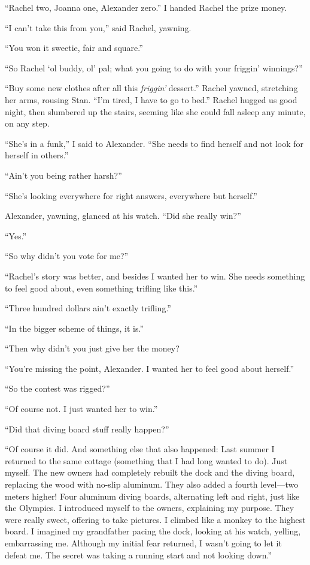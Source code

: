 ``Rachel two, Joanna one, Alexander zero.'' I handed Rachel the prize
money.

``I can't take this from you,'' said Rachel, yawning.

``You won it sweetie, fair and square.''

``So Rachel `ol buddy, ol' pal; what you going to do with your friggin'
winnings?''

``Buy some new clothes after all this \emph{friggin'} dessert.'' Rachel
yawned, stretching her arms, rousing Stan. ``I'm tired, I have to go to
bed.'' Rachel hugged us good night, then slumbered up the stairs,
seeming like she could fall asleep any minute, on any step.

``She's in a funk,'' I said to Alexander. ``She needs to find herself
and not look for herself in others.''

``Ain't you being rather harsh?''

``She's looking everywhere for right answers, everywhere but herself.''

Alexander, yawning, glanced at his watch. ``Did she really win?''

``Yes.''

``So why didn't you vote for me?''

``Rachel's story was better, and besides I wanted her to win. She needs
something to feel good about, even something trifling like this.''

``Three hundred dollars ain't exactly trifling.''

``In the bigger scheme of things, it is.''

``Then why didn't you just give her the money?

``You're missing the point, Alexander. I wanted her to feel good about
herself.''

``So the contest was rigged?''

``Of course not. I just wanted her to win.''

``Did that diving board stuff really happen?''

``Of course it did. And something else that also happened: Last summer I
returned to the same cottage (something that I had long wanted to do).
Just myself. The new owners had completely rebuilt the dock and the
diving board, replacing the wood with no-slip aluminum. They also added
a fourth level---two meters higher! Four aluminum diving boards,
alternating left and right, just like the Olympics. I introduced myself
to the owners, explaining my purpose. They were really sweet, offering
to take pictures. I climbed like a monkey to the highest board. I
imagined my grandfather pacing the dock, looking at his watch, yelling,
embarrassing me. Although my initial fear returned, I wasn't going to
let it defeat me. The secret was taking a running start and not looking
down.''

